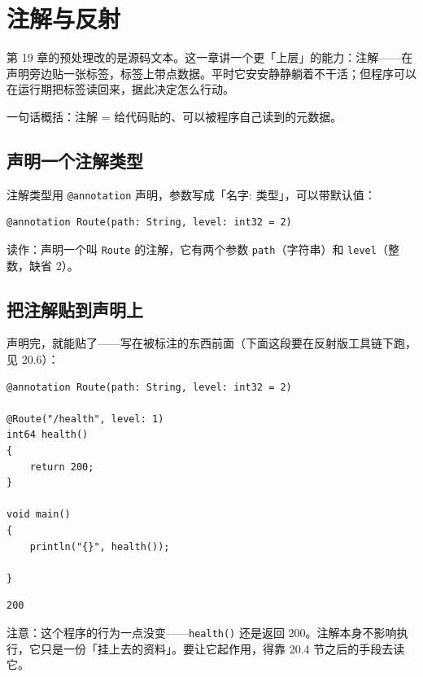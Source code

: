 \chapter{注解与反射}
\label{ch:20}

第 19 章的预处理改的是源码文本。这一章讲一个更「上层」的能力：注解——在声明旁边贴一张标签，标签上带点数据。平时它安安静静躺着不干活；但程序可以在运行期把标签读回来，据此决定怎么行动。

一句话概括：注解 = 给代码贴的、可以被程序自己读到的元数据。

\section{声明一个注解类型}

注解类型用 \texttt{@annotation} 声明，参数写成「名字: 类型」，可以带默认值：

\par
\medskip
\begin{lstlisting}[style=chali]
@annotation Route(path: String, level: int32 = 2)
\end{lstlisting}
\par
\medskip

读作：声明一个叫 \texttt{Route} 的注解，它有两个参数 \texttt{path}（字符串）和 \texttt{level}（整数，缺省 2）。

\section{把注解贴到声明上}

声明完，就能贴了——写在被标注的东西前面（下面这段要在反射版工具链下跑，见 20.6）：

\par
\medskip
\begin{lstlisting}[style=chali]
@annotation Route(path: String, level: int32 = 2)

@Route("/health", level: 1)
int64 health()
{
    return 200;
}

void main()
{
    println("{}", health());

}
\end{lstlisting}
\par
\medskip

\par
\medskip
\begin{lstlisting}[style=out]
200
\end{lstlisting}
\par
\medskip

注意：这个程序的行为一点没变——\texttt{health(\allowbreak{})\allowbreak{}} 还是返回 200。注解本身不影响执行，它只是一份「挂上去的资料」。要让它起作用，得靠 20.4 节之后的手段去读它。

